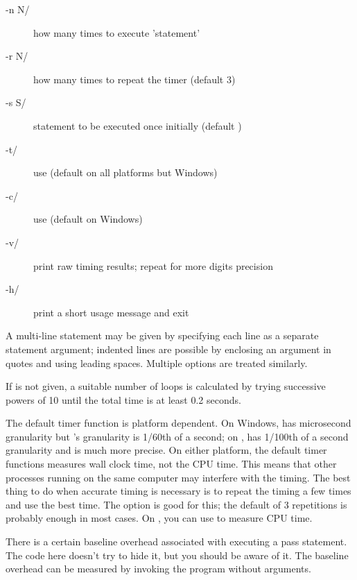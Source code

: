 \begin{description}
\item[-n N/] how many times to execute 'statement'
\item[-r N/] how many times to repeat the timer (default 3)
\item[-s S/] statement to be executed once initially (default
)
\item[-t/] use 
(default on all platforms but Windows)
\item[-c/] use  (default on Windows)
\item[-v/] print raw timing results; repeat for more digits
precision
\item[-h/] print a short usage message and exit
\end{description}

A multi-line statement may be given by specifying each line as a
separate statement argument; indented lines are possible by enclosing
an argument in quotes and using leading spaces.  Multiple
 options are treated similarly.

If  is not given, a suitable number of loops is
calculated by trying successive powers of 10 until the total time is
at least 0.2 seconds.

The default timer function is platform dependent.  On Windows,
 has microsecond granularity but
's granularity is 1/60th of a second; on \UNIX,
 has 1/100th of a second granularity and
 is much more precise.  On either platform, the
default timer functions measures wall clock time, not the CPU time.
This means that other processes running on the same computer may
interfere with the timing.  The best thing to do when accurate timing
is necessary is to repeat the timing a few times and use the best
time.  The  option is good for this; the default of 3
repetitions is probably enough in most cases.  On \UNIX, you can use
 to measure CPU time.

\begin{notice}
  There is a certain baseline overhead associated with executing a
  pass statement.  The code here doesn't try to hide it, but you
  should be aware of it.  The baseline overhead can be measured by
  invoking the program without arguments.
\end{notice}

